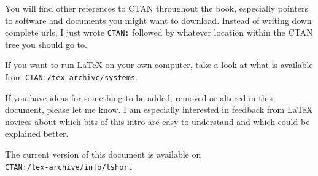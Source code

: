 You will find other references to CTAN throughout the book, especially
pointers to software and documents you might want to download. Instead
of writing down complete urls, I just wrote \texttt{CTAN:} followed by
whatever location within the CTAN tree you should go to. 

If you want to run \LaTeX{} on your own computer, take a look at what
is available from \texttt{CTAN:/tex-archive/systems}.

\noindent If you have ideas for something to be
added, removed or altered in this document, please let me know. I am
especially interested in feedback from \LaTeX{} novices about which
bits of this intro are easy to understand and which could be explained
better.

\bigskip
\begin{verse}
%
\end{verse}
\noindent The current version of this document is available on\\
\texttt{CTAN:/tex-archive/info/lshort}

\endinput



%

